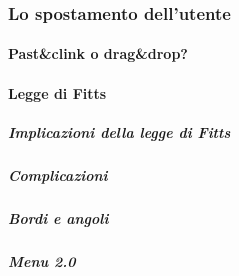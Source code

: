 		\subsubsection{Lo spostamento dell'utente}
		
			\paragraph{Past\&clink o drag\&drop?}
		
			\paragraph{Legge di Fitts}
			
				\subparagraph{Implicazioni della legge di Fitts}
				\subparagraph{Complicazioni}
				
				\subparagraph{Bordi e angoli}
				
				\subparagraph{Menu 2.0}
				
				